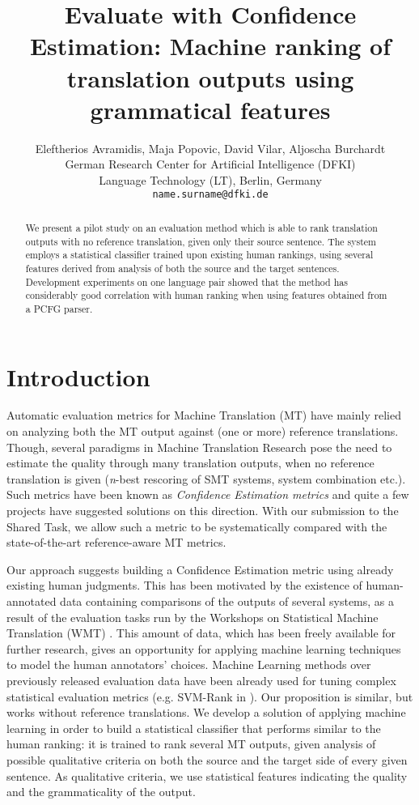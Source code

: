 \documentclass[11pt]{article}
\title{Evaluate with Confidence Estimation: Machine ranking of translation
outputs using grammatical features}
\author{
  Eleftherios Avramidis, Maja Popovic, David Vilar, Aljoscha Burchardt \\
  German Research Center for Artificial Intelligence (DFKI) \\
  Language Technology (LT), Berlin, Germany \\
  {\tt name.surname@dfki.de} 
}
\date{}
\begin{document}
\maketitle
\begin{abstract}
We present a pilot study on an evaluation method which is able to rank 
translation outputs with no reference translation, given only their source sentence. The
system employs a statistical classifier trained upon existing human rankings, 
using several features derived from analysis of both the source and the target
sentences. Development experiments on one language pair showed that the method
has considerably good correlation with human ranking when using features
obtained from a PCFG parser.
  
\end{abstract}

\section{Introduction}
Automatic evaluation metrics for Machine Translation (MT) have mainly relied on
analyzing both the MT output against (one or more) reference translations.
Though, several paradigms in Machine Translation Research pose the need to
estimate the quality through many translation outputs, when no reference
translation is given (\textit{n}-best rescoring of SMT systems, system
combination etc.). Such metrics have been known as \textit{Confidence Estimation
metrics} and quite a few projects have suggested solutions on this direction.
With our submission to the Shared Task, we allow such a
metric to be systematically compared with the state-of-the-art reference-aware MT
metrics.

Our approach suggests building a Confidence Estimation metric using
already existing human judgments. This has been motivated by the existence
of human-annotated data containing comparisons of the outputs of several
systems, as a result of the evaluation tasks run by the Workshops on
Statistical Machine Translation
(\textsc{WMT})
\cite{callisonburch-EtAl:2008:WMT,callisonburch-EtAl:2009:WMT-09,callisonburch-EtAl:2010:WMT}.
This amount of data, which has been freely available for further research, gives
an opportunity for applying machine learning techniques to model the human
annotators' choices. Machine Learning methods over previously released 
evaluation data have been already used for tuning complex
statistical evaluation metrics (e.g. SVM-Rank in
). %
Our proposition is similar, but works without reference translations. 
We develop a solution of applying machine learning in order to build a
statistical classifier that performs similar to the human ranking: it is trained
to rank several MT outputs, given analysis of possible qualitative criteria on
both the source and the target side of every given sentence. As qualitative
criteria, we use statistical features indicating the quality and
the grammaticality of the output.
\end{document}
